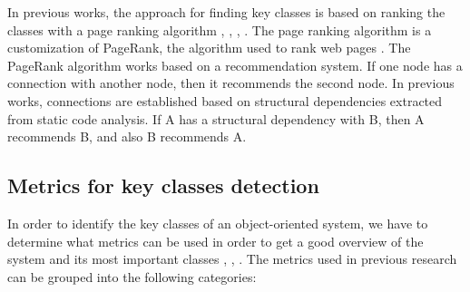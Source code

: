 \documentclass[12pt]{mitthesis}
\begin{document}
In previous works, the approach for finding key classes is based on ranking the classes with a page ranking algorithm \cite{PagerankENASE}, \cite{enase15}, \cite{Finding-key-classes}, \cite{PagerankSACI} . The page ranking algorithm is a customization of PageRank, the algorithm used to rank web pages \cite{ilprints422}. 
The PageRank algorithm works based on a recommendation system. If one node has a connection with another node, then it recommends the second node. In previous works, connections are established based on structural dependencies extracted from static code analysis. If A has a structural dependency with B, then A recommends B, and also B recommends A. 

\subsection{Metrics for key classes detection}
In order to identify the key classes of an object-oriented system, we have to determine what metrics can be used in order to get a good overview of the system and its most important classes \cite{Ding2016AnIA}, \cite{ZaidmanJurnal}, \cite{PAN2018188} . 
The metrics used in previous research can be grouped into the following categories: 
\end{document}
